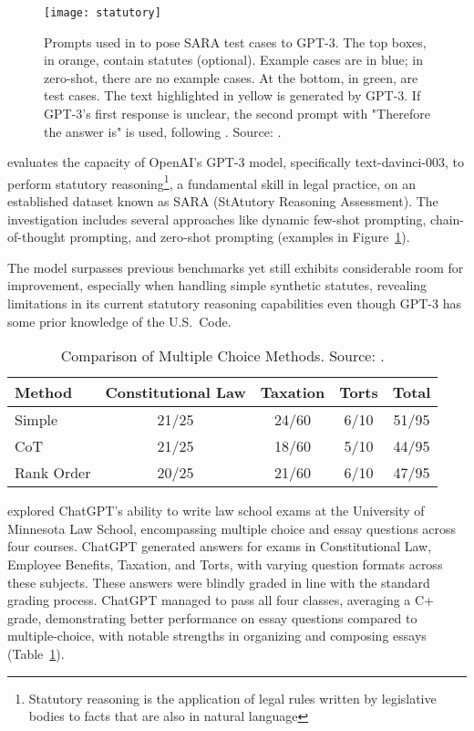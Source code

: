\begin{figure}[!h]
	\centering
	\texttt{[image: statutory]}
	\caption{Prompts used in \protect\textcite{blairstanek2023gpt3statutory} to pose SARA test cases to GPT-3. The top boxes, in orange, contain statutes (optional). Example cases are in blue; in zero-shot, there are no example cases. At the bottom, in green, are test cases. The text highlighted in yellow is generated by GPT-3. If GPT-3’s first response is unclear, the second prompt with "Therefore the answer is" is used, following \protect\textcite{kojima2023large}. Source: \protect\textcite{trautmann2022legalprompt}.}
	\label{fig:legal_prompting}
\end{figure}


\textcite{blairstanek2023gpt3statutory} evaluates the capacity of OpenAI's GPT-3 model, specifically text-davinci-003, to perform statutory reasoning\footnote{Statutory reasoning is the application of legal rules written by legislative bodies to facts that are also in natural language}, a fundamental skill in legal practice, on an established dataset known as SARA (StAtutory Reasoning Assessment).
The investigation includes several approaches like dynamic few-shot prompting, chain-of-thought prompting, and zero-shot prompting (examples in Figure~\ref{fig:legal_prompting}).

The model surpasses previous benchmarks yet still exhibits considerable room for improvement, especially when handling simple synthetic statutes, revealing limitations in its current statutory reasoning capabilities even though GPT-3 has some prior knowledge of the U.S.\ Code.

\begin{table}[!h]
	\centering
	\begin{tabularx}{\textwidth}{Xcccc}
		\toprule
		Method     & Constitutional Law & Taxation & Torts & Total \\
		\midrule
		Simple     & 21/25              & 24/60    & 6/10  & 51/95 \\
		CoT        & 21/25              & 18/60    & 5/10  & 44/95 \\
		Rank Order & 20/25              & 21/60    & 6/10  & 47/95 \\
		\bottomrule
	\end{tabularx}
	\caption{Comparison of Multiple Choice Methods. Source: \protect\textcite{choi2023chatgptlaw}.}
	\label{tab:mc_comparison}
\end{table}

\textcite{choi2023chatgptlaw} explored ChatGPT's ability to write law school exams at the University of Minnesota Law School, encompassing multiple choice and essay questions across four courses.
ChatGPT generated answers for exams in Constitutional Law, Employee Benefits, Taxation, and Torts, with varying question formats across these subjects.
These answers were blindly graded in line with the standard grading process.
ChatGPT managed to pass all four classes, averaging a C+ grade, demonstrating better performance on essay questions compared to multiple-choice, with notable strengths in organizing and composing essays (Table~\ref{tab:mc_comparison}).

